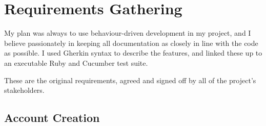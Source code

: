 \chapter{Requirements Gathering}\label{appendix:requirements}

My plan was always to use behaviour-driven development in my project, and I believe passionately in keeping all documentation as closely in line with the code as possible. I used Gherkin syntax to describe the features, and linked these up to an executable Ruby and Cucumber test suite.

These are the original requirements, agreed and signed off by all of the project's stakeholders. %

\section{Account Creation}

